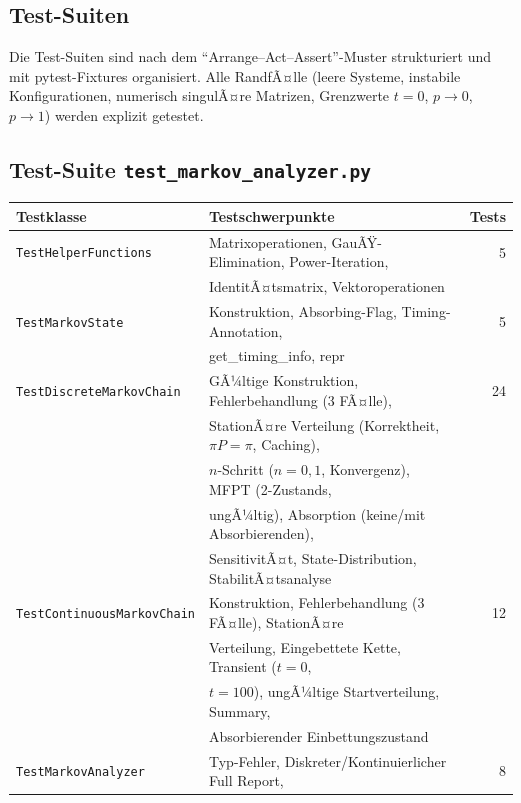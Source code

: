 ﻿\documentclass[a4paper,12pt]{report}
\theoremstyle{definition}
\begin{document}
\subsection{Test-Suiten}
\label{sec:tests-impl}

Die Test-Suiten sind nach dem ``Arrange--Act--Assert''-Muster strukturiert
und mit pytest-Fixtures organisiert. Alle RandfÃ¤lle (leere Systeme,
instabile Konfigurationen, numerisch singulÃ¤re Matrizen, Grenzwerte $t=0$,
$p \to 0$, $p \to 1$) werden explizit getestet.

\subsection{Test-Suite \texttt{test\_markov\_analyzer.py}}

\begin{table}
	\centering
	\begin{tabular}{@{}llr@{}}
		\toprule
		\textbf{Testklasse} & \textbf{Testschwerpunkte} & \textbf{Tests} \\
		\midrule
		\texttt{TestHelperFunctions} & Matrixoperationen, GauÃŸ-Elimination,
		Power-Iteration, & 5 \\
		& IdentitÃ¤tsmatrix, Vektoroperationen & \\
		\texttt{TestMarkovState} & Konstruktion, Absorbing-Flag,
		Timing-Annotation, & 5 \\
		& get\_timing\_info, repr & \\
		\texttt{TestDiscreteMarkovChain} & GÃ¼ltige Konstruktion, Fehlerbehandlung
		(3 FÃ¤lle), & 24 \\
		& StationÃ¤re Verteilung (Korrektheit, $\pi P=\pi$, Caching), & \\
		& $n$-Schritt ($n=0,1$, Konvergenz), MFPT (2-Zustands, & \\
		& ungÃ¼ltig), Absorption (keine/mit Absorbierenden), & \\
		& SensitivitÃ¤t, State-Distribution, StabilitÃ¤tsanalyse & \\
		\texttt{TestContinuousMarkovChain} & Konstruktion, Fehlerbehandlung
		(3 FÃ¤lle), StationÃ¤re & 12 \\
		& Verteilung, Eingebettete Kette, Transient ($t=0$, & \\
		& $t=100$), ungÃ¼ltige Startverteilung, Summary, & \\
		& Absorbierender Einbettungszustand & \\
		\texttt{TestMarkovAnalyzer} & Typ-Fehler, Diskreter/Kontinuierlicher
		Full Report, & 8 \\

\end{tabular}
\end{table}
\end{document}
